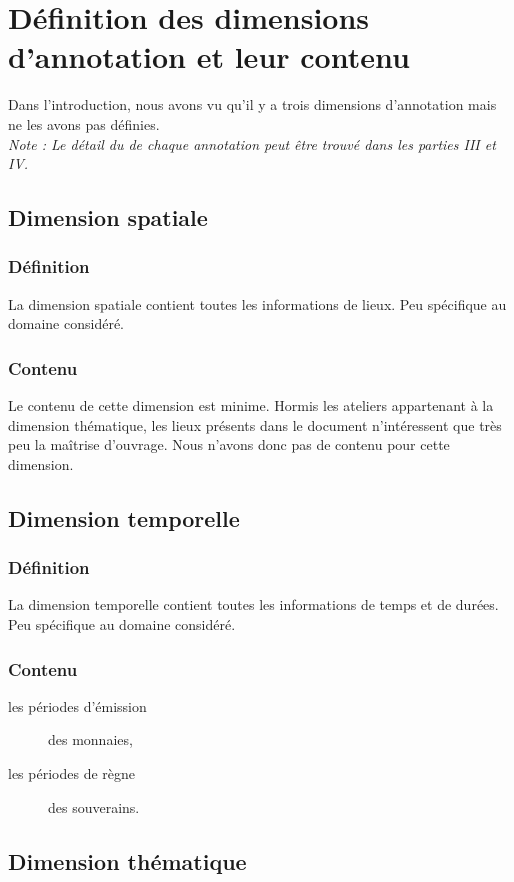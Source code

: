 \documentclass[a4paper, 11pt]{report}
\begin{document}
	\section{Définition des dimensions d'annotation et leur contenu}
    Dans l'introduction, nous avons vu qu'il y a trois dimensions d'annotation mais ne les avons pas définies.\\
	\textit{Note : Le détail du de chaque annotation peut être trouvé dans les parties III et IV.}
    \subsection{Dimension spatiale}
    \subsubsection{Définition}
     La dimension spatiale contient toutes les informations de lieux. Peu spécifique au domaine considéré.
    \subsubsection{Contenu}
       Le contenu de cette dimension est minime. Hormis les ateliers appartenant à la dimension thématique, les lieux présents dans le document n'intéressent que très peu la maîtrise d'ouvrage. Nous n'avons donc pas de contenu pour cette dimension.
	\subsection{Dimension temporelle}
	    \subsubsection{Définition}
    La dimension temporelle contient toutes les informations de temps et de durées. Peu spécifique au domaine considéré.\\
    \subsubsection{Contenu}
    \begin{description}
    \item[les périodes d'émission] des monnaies,
    \item[les périodes de règne] des souverains.
    \end{description}
    
	\subsection{Dimension thématique}
\end{document}
